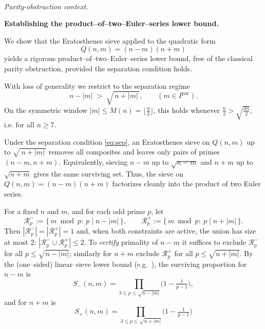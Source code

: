 \documentclass[11pt]{article}
\makeatletter
\theoremstyle{inline}
\theoremstyle{break}
\renewenvironment{proof}[1][\proofname]{%
  \par\pushQED{\qed}%
  \normalfont \topsep6\p@\@plus6\p@\relax
  \trivlist
  \item[\hskip\labelsep
        \itshape
    #1\@addpunct{.}]\mbox{}\\  %
}{%
  \popQED\endtrivlist\@endpefalse
}
\theoremstyle{break}
\theoremstyle{break}
\theoremstyle{break}
\theoremstyle{break}
\theoremstyle{inline}
\makeatother
\begin{document}
\begin{proof}
\emph{Parity-obstruction context.}

\noindent\textbf{Establishing the product--of--two--Euler--series lower bound.}

We show that the Eratosthenes sieve\cite{FriedlanderIwaniec2010} applied to the quadratic form
\begin{equation}
Q(n,m)=(n-m)(n+m)
\end{equation}
yields a rigorous product--of--two--Euler--series lower bound, free of the
classical parity obstruction\cite{Chen1973, IwaniecKowalski2004}, provided the separation condition holds.

With loss of generality we restrict to the separation regime
\begin{equation}\label{eq:sep}
n-|m|\;>\;\sqrt{\,n+|m|\,}, \qquad (m\in I^{\mathrm{par}}).
\end{equation}
On the symmetric window \(|m|\le M(n)=\lfloor \frac{n}{2} \rfloor\), this holds whenever
\(\frac{n}{2} > \sqrt{\frac{3n}{2}}\), i.e. for all \(n\ge7\).  

Under the separation condition \eqref{eq:sep}, an Eratosthenes sieve on \(Q(n,m)\) up to
\(\sqrt{\,n+|m|\,}\) removes all composites and leaves only pairs of primes
\((n-m,n+m)\). Equivalently, sieving \(n-m\) up to \(\sqrt{n-m}\) and \(n+m\)
up to \(\sqrt{n+m}\) gives the same surviving set.  Thus, the sieve on \(Q(n,m)=(n-m)(n+m)\)
factorizes cleanly into the product of two Euler series.\cite{Vaughan1997}

For a fixed \(n\) and \(m\), and for each odd prime \(p\), let
\begin{equation}
\mathcal R_p^-:=\{\,m\bmod p:\ p\mid n-|m|\,\},\qquad
\mathcal R_p^+:=\{\,m\bmod p:\ p\mid n+|m|\,\}.
\end{equation}
Then \(|\mathcal R_p^-|=|\mathcal R_p^+|=1\) and, when both constraints are active,
the union has size at most \(2\):
\(|\mathcal R_p^-\cup\mathcal R_p^+|\le 2\).
To \emph{certify} primality of \(n\!-\!m\) it suffices to exclude
\(\mathcal R_p^-\) for all \(p\le\sqrt{n-|m|}\); similarly for \(n\!+\!m\)
exclude \(\mathcal R_p^+\) for all \(p\le\sqrt{n+|m|}\).
By the (one–sided) linear–sieve lower bound (e.g.\ \cite[Ch.~6]{IwaniecKowalski2004}),
the surviving proportion for \(n\!-\!m\) is
\begin{equation}
S_-(n,m) = \prod_{3\le p\le \sqrt{n-|m|}}\!\bigl(1-\tfrac{1}{p-1}\bigr),
\end{equation}
and for \(n\!+\!m\) is
\begin{equation}
S_+(n,m) = \prod_{3\le p\le \sqrt{n+|m|}}\!\bigl(1-\tfrac{1}{p-1}\bigr)
\end{equation}


\end{proof}
\end{document}
